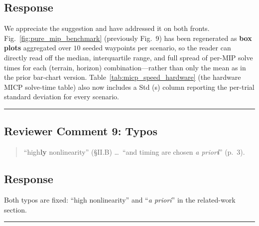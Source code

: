 \subsection{Response}
We appreciate the suggestion and have addressed it on both fronts. Fig.~\ref{fig:pure_mip_benchmark} (previously Fig.~9) has been regenerated as \textbf{box plots} aggregated over $10$ seeded waypoints per scenario, so the reader can directly read off the median, interquartile range, and full spread of per-MIP solve times for each (terrain, horizon) combination---rather than only the mean as in the prior bar-chart version. Table~\ref{tab:micp_speed_hardware} (the hardware MICP solve-time table) also now includes a Std (s) column reporting the per-trial standard deviation for every scenario.

\noindent\rule{17cm}{2.0pt}

\subsection{Reviewer Comment 9: Typos}
\begin{mdframed}
\begin{quote}
``high\textbf{ly} nonlinearity'' (\S II.B) \ldots\ ``and timing are chosen \textit{a prior\textbf{i}}'' (p.~3).
\end{quote}
\end{mdframed}

\subsection{Response}
Both typos are fixed: ``high nonlinearity'' and ``\textit{a priori}'' in the related-work section.

\noindent\rule{17cm}{6.0pt}
\newpage
